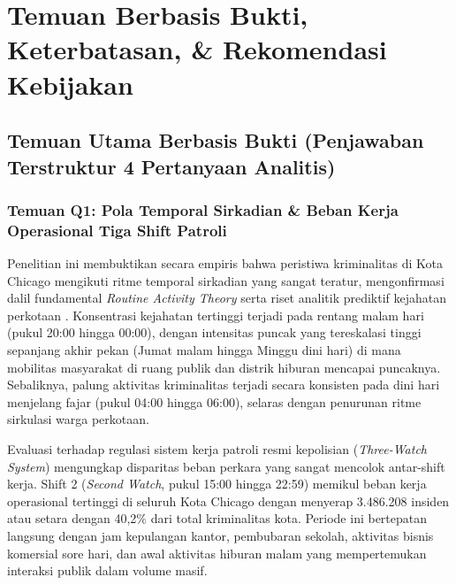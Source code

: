 \documentclass[11pt,a4paper]{article}
\begin{document}
\section{Temuan Berbasis Bukti, Keterbatasan, \& Rekomendasi Kebijakan}

\subsection{Temuan Utama Berbasis Bukti (Penjawaban Terstruktur 4 Pertanyaan Analitis)}

\subsubsection{Temuan Q1: Pola Temporal Sirkadian \& Beban Kerja Operasional Tiga Shift Patroli}
Penelitian ini membuktikan secara empiris bahwa peristiwa kriminalitas di Kota Chicago mengikuti ritme temporal sirkadian yang sangat teratur, mengonfirmasi dalil fundamental \textit{Routine Activity Theory} serta riset analitik prediktif kejahatan perkotaan \cite{towers2018, stec2018}. Konsentrasi kejahatan tertinggi terjadi pada rentang malam hari (pukul 20:00 hingga 00:00), dengan intensitas puncak yang tereskalasi tinggi sepanjang akhir pekan (Jumat malam hingga Minggu dini hari) di mana mobilitas masyarakat di ruang publik dan distrik hiburan mencapai puncaknya. Sebaliknya, palung aktivitas kriminalitas terjadi secara konsisten pada dini hari menjelang fajar (pukul 04:00 hingga 06:00), selaras dengan penurunan ritme sirkulasi warga perkotaan.

Evaluasi terhadap regulasi sistem kerja patroli resmi kepolisian (\textit{Three-Watch System}) mengungkap disparitas beban perkara yang sangat mencolok antar-shift kerja. Shift 2 (\textit{Second Watch}, pukul 15:00 hingga 22:59) memikul beban kerja operasional tertinggi di seluruh Kota Chicago dengan menyerap 3.486.208 insiden atau setara dengan 40,2\% dari total kriminalitas kota. Periode ini bertepatan langsung dengan jam kepulangan kantor, pembubaran sekolah, aktivitas bisnis komersial sore hari, dan awal aktivitas hiburan malam yang mempertemukan interaksi publik dalam volume masif.
\end{document}
